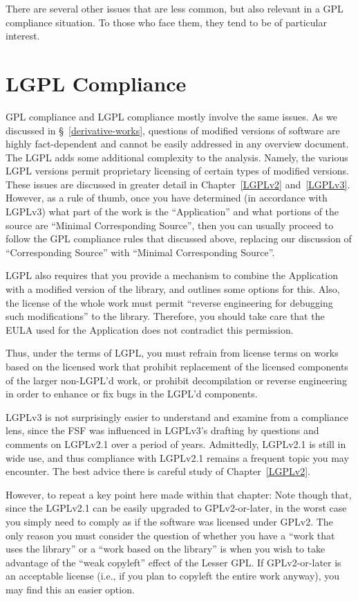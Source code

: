 There are several other issues that are less common, but also relevant in
a GPL compliance situation.  To those who face them, they tend to be of
particular interest.

\section{LGPL Compliance}
\label{lgpl}

GPL compliance and LGPL compliance mostly involve the same issues.  As we
discussed in \S~\ref{derivative-works}, questions of modified versions of
software are highly fact-dependent and cannot be easily addressed in any
overview document.  The LGPL adds some additional complexity to the
analysis.  Namely, the various LGPL versions permit proprietary licensing
of certain types of modified versions.  These issues are discussed in greater
detail in Chapter~\ref{LGPLv2} and~\ref{LGPLv3}.  However, as a rule of thumb, once you have determined
(in accordance with LGPLv3) what part of the work is the ``Application''
and what portions of the source are ``Minimal Corresponding Source'', then
you can usually proceed to follow the GPL compliance rules that
discussed above, replacing our discussion of ``Corresponding Source'' with
``Minimal Corresponding Source''.

LGPL also requires that you provide a mechanism to combine the Application
with a modified version of the library, and outlines some options for
this.  Also, the license of the whole work must permit ``reverse
engineering for debugging such modifications'' to the library.  Therefore,
you should take care that the EULA used for the Application does not
contradict this permission.

Thus, under the terms of LGPL, you must refrain from license terms on works
based on the licensed work that prohibit replacement of the licensed
components of the larger non-LGPL’d work, or prohibit decompilation or
reverse engineering in order to enhance or fix bugs in the LGPL’d components.

LGPLv3 is not surprisingly easier to understand and examine from a compliance
lens, since the FSF was influenced in LGPLv3's drafting by questions and
comments on LGPLv2.1 over a period of years.  Admittedly, LGPLv2.1 is still
in wide use, and thus compliance with LGPLv2.1 remains a frequent topic you
may encounter.  The best advice there is careful study of
Chapter~\ref{LGPLv2}.

However, to repeat a key point here made within that chapter: Note though
that, since the LGPLv2.1 can be easily upgraded to GPLv2-or-later, in the
worst case you simply need to comply as if the software was licensed under
GPLv2.  The only reason you must consider the question of whether you have a
``work that uses the library'' or a ``work based on the library'' is when you
wish to take advantage of the ``weak copyleft'' effect of the Lesser GPL\@.
If GPLv2-or-later is an acceptable license (i.e., if you plan to copyleft the
entire work anyway), you may find this an easier option.

